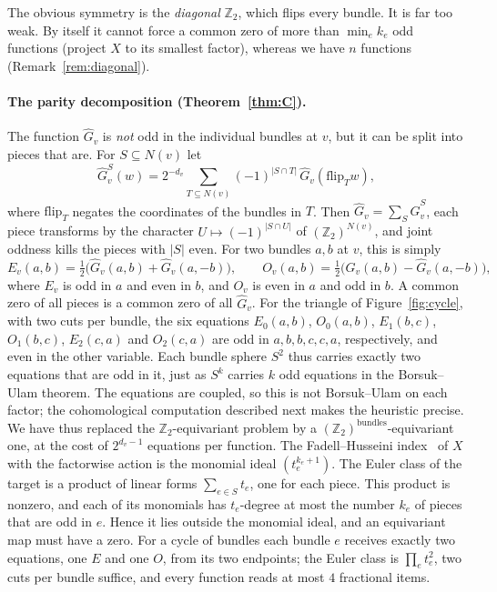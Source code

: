 \documentclass[11pt,letterpaper]{article}
\theoremstyle{definition}
\newcommand{\Z}{\mathbb{Z}}
\newcommand{\flip}{\mathrm{flip}}
\newcommand{\hG}{\widehat{G}}
\begin{document}
The obvious symmetry is the \emph{diagonal} $\Z_2$, which flips every bundle. It is far too
weak. By itself it cannot force a common zero of more than $\min_ek_e$ odd functions (project $X$
to its smallest factor), whereas we have $n$ functions (Remark~\ref{rem:diagonal}).

\paragraph{The parity decomposition (Theorem~\ref{thm:C}).}
The function $\hG_v$ is \emph{not} odd in the individual bundles at $v$, but it can be split into
pieces that are. For $S\subseteq N(v)$ let
\[
  \hG_v^S(w)=2^{-d_v}\sum_{T\subseteq N(v)}(-1)^{|S\cap T|}\,\hG_v(\flip_Tw),
\]
where $\flip_T$ negates the coordinates of the bundles in $T$. Then $\hG_v=\sum_S\hG_v^S$, each
piece transforms by the character $U\mapsto(-1)^{|S\cap U|}$ of $(\Z_2)^{N(v)}$, and joint oddness
kills the pieces with $|S|$ even. For two bundles $a,b$ at $v$, this is simply
\[
  E_v(a,b)=\tfrac12\bigl(\hG_v(a,b)+\hG_v(a,-b)\bigr),\qquad
  O_v(a,b)=\tfrac12\bigl(\hG_v(a,b)-\hG_v(a,-b)\bigr),
\]
where $E_v$ is odd in $a$ and even in $b$, and $O_v$ is even in $a$ and odd in $b$. A common zero
of all pieces is a common zero of all $\hG_v$. For the triangle of Figure~\ref{fig:cycle}, with two
cuts per bundle, the six equations $E_0(a,b)$, $O_0(a,b)$, $E_1(b,c)$, $O_1(b,c)$, $E_2(c,a)$ and
$O_2(c,a)$ are odd in $a,b,b,c,c,a$, respectively, and even in the other variable. Each bundle
sphere $S^2$ thus carries exactly two equations that are odd in it, just as $S^k$ carries $k$ odd
equations in the Borsuk--Ulam theorem. The equations are coupled, so this is not Borsuk--Ulam on
each factor; the cohomological computation described next makes the heuristic precise. We have thus replaced the $\Z_2$-equivariant
problem by a $(\Z_2)^{\text{bundles}}$-equivariant one, at the cost of $2^{d_v-1}$ equations per
function. The Fadell--Husseini index~\cite{FH88} of $X$ with the factorwise action is the monomial
ideal $(t_e^{k_e+1})$. The Euler class of the target is a product of linear forms
$\sum_{e\in S}t_e$, one for each piece. This product is nonzero, and each of its monomials has
$t_e$-degree at most the number $k_e$ of pieces that are odd in $e$. Hence it lies outside the
monomial ideal, and an equivariant map must have a zero. For a cycle of bundles each bundle $e$ receives exactly two equations, one $E$ and
one $O$, from its two endpoints; the Euler class is $\prod_et_e^2$, two cuts per bundle suffice,
and every function reads at most $4$ fractional items.
\end{document}
